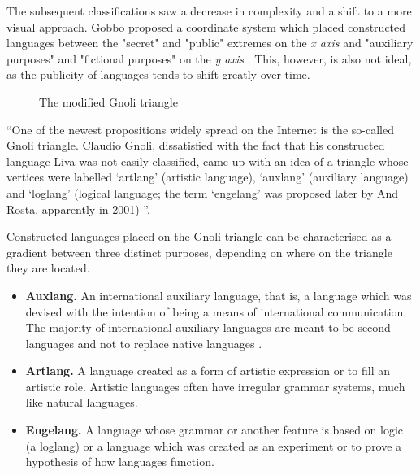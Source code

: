 \documentclass[14pt, a4paper]{extreport}
\begin{document}
The subsequent classifications saw a decrease in complexity and a shift to a more visual approach. Gobbo proposed a coordinate system which placed constructed languages between the "secret" and "public" extremes on the \textit{x axis} and "auxiliary purposes" and "fictional purposes" on the \textit{y axis} \parencite{gobbo}. This, however, is also not ideal, as the publicity of languages tends to shift greatly over time.

\begin{figure}[ht]%
  \bigskip
  \centering
  \caption{The modified Gnoli triangle}
\end{figure}%

``One of the newest propositions widely spread on the Internet is the so-called Gnoli triangle. Claudio Gnoli, dissatisfied with the fact that his constructed language Liva was not easily classified, came up with an idea of a triangle whose vertices were labelled ‘artlang’ (artistic language), ‘auxlang’ (auxiliary language) and ‘loglang’ (logical language; the term ‘engelang’ was proposed later by And Rosta, apparently in 2001) \parencite[97]{stria}''.

Constructed languages placed on the Gnoli triangle can be characterised as a gradient between three distinct purposes, depending on where on the triangle they are located.

\begin{itemize}
  \item \textbf{Auxlang.} An international auxiliary language, that is, a language which was devised with the intention of being a means of international communication. The majority of international auxiliary languages are meant to be second languages and not to replace native languages \parencite{reed}.
  \item \textbf{Artlang.} A language created as a form of artistic expression or to fill an artistic role. Artistic languages often have irregular grammar systems, much like natural languages.
  \item \textbf{Engelang.} A language whose grammar or another feature is based on logic (a loglang) or a language which was created as an experiment or to prove a hypothesis of how languages function.
\end{itemize}
\end{document}
